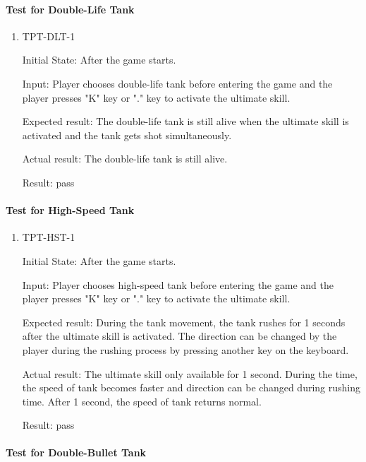 \documentclass[12pt, titlepage]{article}
\begin{document}
\paragraph{Test for Double-Life Tank}

\begin{enumerate}

\item{TPT-DLT-1\\}
					
Initial State: After the game starts.
					
Input: Player chooses double-life tank before entering the game and the player presses "K" key or "." key to activate the ultimate skill.
					
Expected result: The double-life tank is still alive when the ultimate skill is activated and the tank gets shot simultaneously.
					
Actual result: The double-life tank is still alive.

Result: pass

\end{enumerate}

\paragraph{Test for High-Speed Tank}

\begin{enumerate}

\item{TPT-HST-1\\}
					
Initial State: After the game starts.
					
Input: Player chooses high-speed tank before entering the game and the player presses "K" key or "." key to activate the ultimate skill.
					
Expected result: During the tank movement, the tank rushes for 1 seconds after the ultimate skill is activated. The direction can be changed by the player during the rushing process by pressing another key on the keyboard.
					
Actual result: The ultimate skill only available for 1 second. During the time, the speed of tank becomes faster and direction can be changed during rushing time. After 1 second, the speed of tank returns normal.

Result: pass

\end{enumerate}

\paragraph{Test for Double-Bullet Tank}
\end{document}
